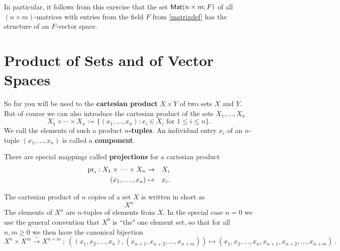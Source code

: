 \documentclass[11pt]{amsbook}
\theoremstyle{definition}
\begin{document}
In particular, it follows from this exercise that the set ${\sf Mat} (n\times m ; F)$ of all $(n\times m)$-matrices with entries from the field $F$ from \eqref{matrixdef} has the structure of an $F$-vector space.



\section{Product of Sets and of Vector Spaces}
\label{cartesian}

So far you will be used to the {\bf cartesian product} $X\times Y$ of two sets $X$ and $Y$. But of course we can also introduce the cartesian product of the sets $X_1, \ldots , X_n$ $$X_1\times \cdots \times X_n := \{ (x_1, \ldots , x_n): x_i \in X_i \text{ for } 1\leqslant i \leqslant n\}.$$
We call the elements of such a product {\bf $n$-tuples}. An individual entry $x_i$ of an $n$-tuple $(x_1, \ldots , x_n)$ is called a {\bf component}.

There are special mappings called {\bf projections} for a cartesian product \begin{eqnarray*} {\rm pr}_i: X_1\times \cdots \times X_n &\to & X_i \\ (x_1, \ldots , x_n) & \mapsto & x_i.\end{eqnarray*}

The cartesian product of $n$ copies of a set $X$ is written in short as $$X^n$$ The elements of $X^n$ are $n$-tuples of elements from $X$. In the special case $n=0$ we use the general convention that $X^0$ is ``the" one element set, so that for all $n,m \geqslant 0$ we then have the canonical bijection 
$$X^n\times X^m \stackrel{\sim}{\to} X^{n+m}~;~((x_1,x_2,\dots,x_n),(
x_{n+1},x_{n+2},\dots,x_{n+m})) \mapsto (x_1,x_2,\dots,x_n,
x_{n+1},x_{n+2},\dots,x_{n+m})~.$$
\end{document}
